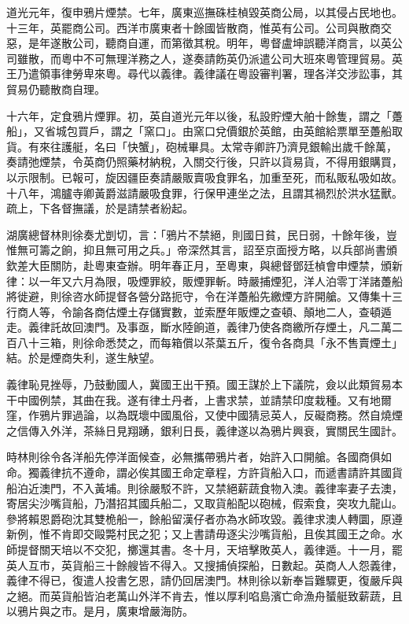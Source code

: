 \begin{pinyinscope}
道光元年，復申鴉片煙禁。七年，廣東巡撫硃桂楨毀英商公局，以其侵占民地也。十三年，英罷商公司。西洋市廣東者十餘國皆散商，惟英有公司。公司與散商交惡，是年遂散公司，聽商自運，而第徵其稅。明年，粵督盧坤誤聽洋商言，以英公司雖散，而粵中不可無理洋務之人，遂奏請飭英仍派遣公司大班來粵管理貿易。英王乃遣領事律勞卑來粵。尋代以義律。義律議在粵設審判署，理各洋交涉訟事，其貿易仍聽散商自理。

十六年，定食鴉片煙罪。初，英自道光元年以後，私設貯煙大舶十餘隻，謂之「躉船」，又省城包買戶，謂之「窯口」。由窯口兌價銀於英館，由英館給票單至躉船取貨。有來往護艇，名曰「快蟹」，砲械畢具。太常寺卿許乃濟見銀輸出歲千餘萬，奏請弛煙禁，令英商仍照藥材納稅，入關交行後，只許以貨易貨，不得用銀購買，以示限制。已報可，旋因疆臣奏請嚴販賣吸食罪名，加重至死，而私販私吸如故。十八年，鴻臚寺卿黃爵滋請嚴吸食罪，行保甲連坐之法，且謂其禍烈於洪水猛獸。疏上，下各督撫議，於是請禁者紛起。

湖廣總督林則徐奏尤剴切，言：「鴉片不禁絕，則國日貧，民日弱，十餘年後，豈惟無可籌之餉，抑且無可用之兵。」帝深然其言，詔至京面授方略，以兵部尚書頒欽差大臣關防，赴粵東查辦。明年春正月，至粵東，與總督鄧廷楨會申煙禁，頒新律：以一年又六月為限，吸煙罪絞，販煙罪斬。時嚴捕煙犯，洋人泊零丁洋諸躉船將徙避，則徐咨水師提督各營分路扼守，令在洋躉船先繳煙方許開艙。又傳集十三行商人等，令諭各商估煙土存儲實數，並索歷年販煙之查頓、顛地二人，查頓遁走。義律託故回澳門。及事亟，斷水陸餉道，義律乃使各商繳所存煙土，凡二萬二百八十三箱，則徐命悉焚之，而每箱償以茶葉五斤，復令各商具「永不售賣煙土」結。於是煙商失利，遂生觖望。

義律恥見挫辱，乃鼓動國人，冀國王出干預。國王謀於上下議院，僉以此類貿易本干中國例禁，其曲在我。遂有律土丹者，上書求禁，並請禁印度栽種。又有地爾窪，作鴉片罪過論，以為既壞中國風俗，又使中國猜忌英人，反礙商務。然自燒煙之信傳入外洋，茶絲日見翔踴，銀利日長，義律遂以為鴉片興衰，實關民生國計。

時林則徐令各洋船先停洋面候查，必無攜帶鴉片者，始許入口開艙。各國商俱如命。獨義律抗不遵命，謂必俟其國王命定章程，方許貨船入口，而遞書請許其國貨船泊近澳門，不入黃埔。則徐嚴駁不許，又禁絕薪蔬食物入澳。義律率妻子去澳，寄居尖沙嘴貨船，乃潛招其國兵船二，又取貨船配以砲械，假索食，突攻九龍山。參將賴恩爵砲沈其雙桅船一，餘船留漢仔者亦為水師攻毀。義律求澳人轉圜，原遵新例，惟不肯即交毆斃村民之犯；又上書請毋逐尖沙嘴貨船，且俟其國王之命。水師提督關天培以不交犯，擲還其書。冬十月，天培擊敗英人，義律遁。十一月，罷英人互市，英貨船三十餘艘皆不得入。又搜捕偵探船，日數起。英商人人怨義律，義律不得已，復遣人投書乞恩，請仍回居澳門。林則徐以新奉旨難驟更，復嚴斥與之絕。而英貨船皆泊老萬山外洋不肯去，惟以厚利啗島濱亡命漁舟蜑艇致薪蔬，且以鴉片與之市。是月，廣東增嚴海防。


\end{pinyinscope}
